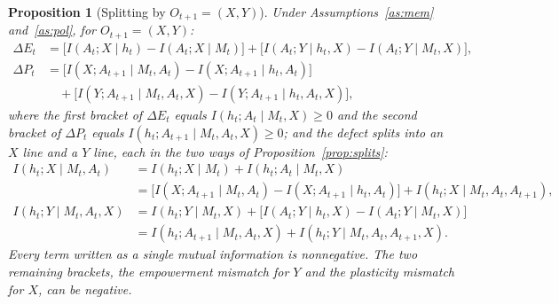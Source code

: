 \documentclass{article}
\newtheorem{proposition}{Proposition}
\theoremstyle{definition}
\theoremstyle{remark}
\newcommand{\dE}{\Delta E}
\newcommand{\dP}{\Delta P}
\begin{document}
\begin{proposition}[Splitting by $O_{t+1}=(X,Y)$]\label{prop:split-xy}
Under Assumptions~\ref{as:mem} and~\ref{as:pol}, for $O_{t+1}=(X,Y)$:
\begin{align*}
\dE_t&=\big[I(A_t;X\mid h_t)-I(A_t;X\mid M_t)\big]+\big[I(A_t;Y\mid h_t,X)-I(A_t;Y\mid M_t,X)\big],\\
\dP_t&=\big[I(X;A_{t+1}\mid M_t,A_t)-I(X;A_{t+1}\mid h_t,A_t)\big]\\
&\quad+\big[I(Y;A_{t+1}\mid M_t,A_t,X)-I(Y;A_{t+1}\mid h_t,A_t,X)\big],
\end{align*}
where the first bracket of $\dE_t$ equals $I(h_t;A_t\mid M_t,X)\ge0$ and the second bracket of $\dP_t$ equals $I(h_t;A_{t+1}\mid M_t,A_t,X)\ge0$;
and the defect splits into an $X$ line and a $Y$ line, each in the two ways of Proposition~\ref{prop:splits}:
\begin{align*}
I(h_t;X\mid M_t,A_t)&=I(h_t;X\mid M_t)+I(h_t;A_t\mid M_t,X)\\
&=\big[I(X;A_{t+1}\mid M_t,A_t)-I(X;A_{t+1}\mid h_t,A_t)\big]+I(h_t;X\mid M_t,A_t,A_{t+1}),\\[4pt]
I(h_t;Y\mid M_t,A_t,X)&=I(h_t;Y\mid M_t,X)+\big[I(A_t;Y\mid h_t,X)-I(A_t;Y\mid M_t,X)\big]\\
&=I(h_t;A_{t+1}\mid M_t,A_t,X)+I(h_t;Y\mid M_t,A_t,A_{t+1},X).
\end{align*}
Every term written as a single mutual information is nonnegative. The two remaining brackets, the empowerment mismatch for $Y$ and the plasticity mismatch for $X$, can be negative.
\end{proposition}
\end{document}
